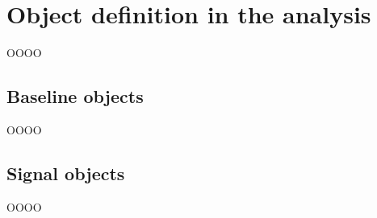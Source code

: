 \section{Object definition in the analysis}
\label{heading:Chapter6-section6-1}

OOOO

\subsection{Baseline objects}
\label{heading:Chapter6-section6-2}

OOOO

\subsection{Signal objects}
\label{heading:Chapter6-section6-3}

OOOO

